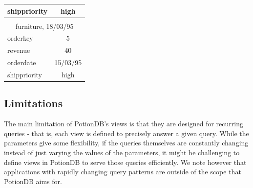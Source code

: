 \documentclass[sigplan,10pt]{acmart}
\begin{document}
\begin{table}
\begin{minipage}{0.2\textwidth}
\begin{tabular}{lc}
		shippriority & high     \\ \hline
		{} & {} \vspace*{-0.4em}    \\
		\multicolumn{2}{c}{furniture, 18/03/95}                            \\ \hline
		orderkey     & 5        \\
		revenue      & 40       \\
		orderdate    & 15/03/95 \\
		shippriority & high    \\ \hline
	\end{tabular}
\vspace{1em}
\label{table:view_update}
	\end{minipage}
\end{table}

\subsection{Limitations}	%
\label{subsec:limitations}

The main limitation of PotionDB's views is that they are designed for recurring queries - that is, each view is defined to precisely answer a given query.
While the parameters give some flexibility, if the queries themselves are constantly changing instead of just varying the values of the parameters, it might be challenging to define views in PotionDB to serve those queries efficiently.
We note however that applications with rapidly changing query patterns are outside of the scope that PotionDB aims for.
\end{document}
